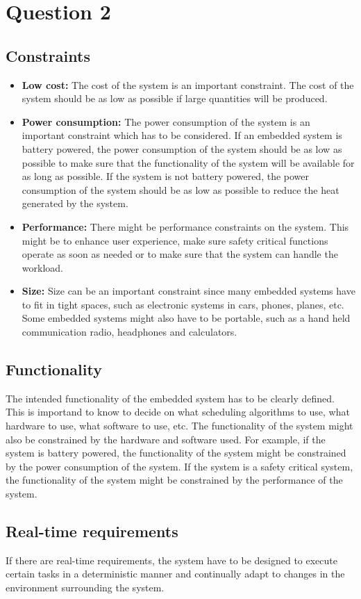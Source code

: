 \section*{Question 2}
    \subsection*{Constraints}
    \begin{itemize}
        \item \textbf{Low cost:} The cost of the system is an important constraint. The cost of the system should be as low as possible if large quantities will be produced.
        \item \textbf{Power consumption:} The power consumption of the system is an important constraint which has to be considered. If an embedded system is battery powered, the power consumption of the system should be as low as possible to make sure that the functionality of the system will be available for as long as possible. If the system is not battery powered, the power consumption of the system should be as low as possible to reduce the heat generated by the system.
        \item \textbf{Performance:} There might be performance constraints on the system. This might be to enhance user experience, make sure safety critical functions operate as soon as needed or to make sure that the system can handle the workload.
        \item \textbf{Size:} Size can be an important constraint since many embedded systems have to fit in tight spaces, such as electronic systems in cars, phones, planes, etc. Some embedded systems might also have to be portable, such as a hand held communication radio, headphones and calculators.
    \end{itemize}

    \subsection*{Functionality}
    The intended functionality of the embedded system has to be clearly defined. This is importand to know to decide on what scheduling algorithms to use, what hardware to use, what software to use, etc. The functionality of the system might also be constrained by the hardware and software used. For example, if the system is battery powered, the functionality of the system might be constrained by the power consumption of the system. If the system is a safety critical system, the functionality of the system might be constrained by the performance of the system.

    \subsection*{Real-time requirements}
    If there are real-time requirements, the system have to be designed to execute certain tasks in a deterministic manner and continually adapt to changes in the environment surrounding the system.